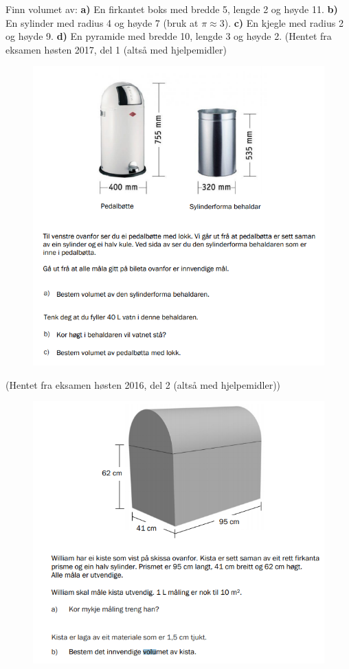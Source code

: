Finn volumet av:\os
	\textbf{a)} En firkantet boks med bredde 5, lengde 2 og høyde 11. \os
\textbf{b)} En sylinder med radius 4 og høyde 7 (bruk at $ \pi\approx 3 $).\os
\textbf{c)} En kjegle med radius 2 og høyde 9.\os
\textbf{d)} En pyramide med bredde 10, lengde 3 og høyde 2.
\newpage
{}
(Hentet fra eksamen høsten 2017, del 1 (altså med hjelpemidler)
\begin{figure}
	\centering
	\includegraphics[scale=0.6]{eks17_2}
\end{figure}
\newpage
{}
(Hentet fra eksamen høsten 2016, del 2 (altså med hjelpemidler))
\begin{figure}
	\centering
	\includegraphics[scale=0.6]{eks_16_5}
\end{figure}

